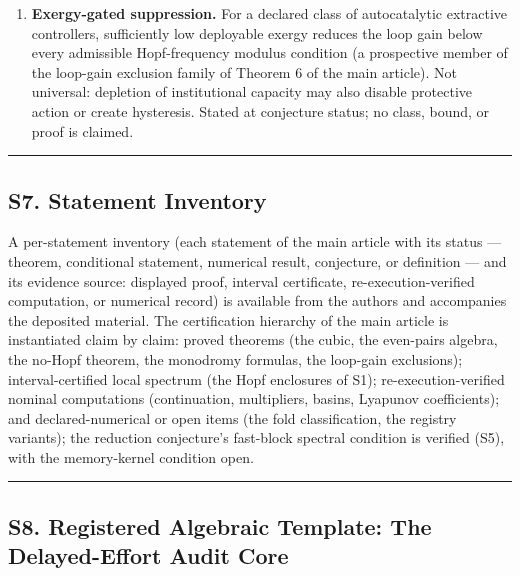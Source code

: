 \documentclass[
  10pt,
  a4paper,
]{article}
\begin{document}
\begin{enumerate}
  independently identified and enter a locally linear loop as a product
  of stable transfer operators, their phase contributions can be
  separated from sufficiently rich input--output data up to declared
  structural symmetries. Missing: structural identifiability of factored
  transfer functions and persistence under feedback.
\item
  \textbf{Exergy-gated suppression.} For a declared class of
  autocatalytic extractive controllers, sufficiently low deployable
  exergy reduces the loop gain below every admissible Hopf-frequency
  modulus condition (a prospective member of the loop-gain exclusion
  family of Theorem 6 of the main article). Not universal: depletion of
  institutional capacity may also disable protective action or create
  hysteresis. Stated at conjecture status; no class, bound, or proof is
  claimed.
\end{enumerate}

\begin{center}\rule{0.5\linewidth}{0.5pt}\end{center}

\subsection{S7. Statement Inventory}\label{s7.-statement-inventory}

A per-statement inventory (each statement of the main article with its
status --- theorem, conditional statement, numerical result, conjecture,
or definition --- and its evidence source: displayed proof, interval
certificate, re-execution-verified computation, or numerical record) is
available from the authors and accompanies the deposited material. The
certification hierarchy of the main article is instantiated claim by
claim: proved theorems (the cubic, the even-pairs algebra, the no-Hopf
theorem, the monodromy formulas, the loop-gain exclusions);
interval-certified local spectrum (the Hopf enclosures of S1);
re-execution-verified nominal computations (continuation, multipliers,
basins, Lyapunov coefficients); and declared-numerical or open items
(the fold classification, the registry variants); the reduction
conjecture's fast-block spectral condition is verified (S5), with the
memory-kernel condition open.

\begin{center}\rule{0.5\linewidth}{0.5pt}\end{center}

\subsection{S8. Registered Algebraic Template: The Delayed-Effort Audit
Core}\label{s8.-registered-algebraic-template-the-delayed-effort-audit-core}
\end{document}
